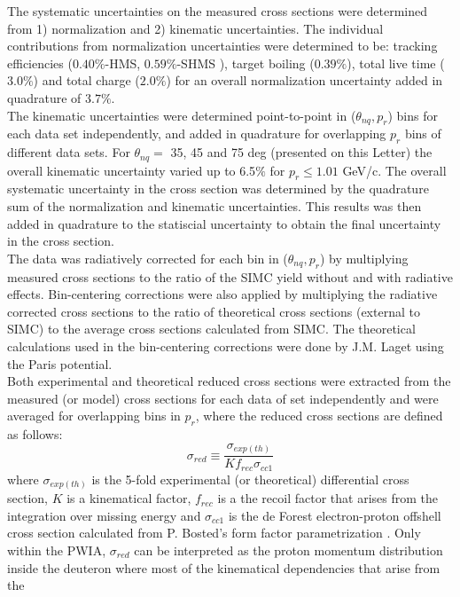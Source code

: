 \indent The systematic uncertainties on the measured cross sections were determined from 1) normalization and 2) kinematic uncertainties. The individual contributions from normalization uncertainties
were determined to be: tracking efficiencies ($0.40 \%$-HMS, $0.59 \%$-SHMS ), target boiling ($0.39 \%$), total live time ($3.0 \%$) and total charge ($2.0\%$)
for an overall normalization uncertainty added in quadrature of $3.7 \%$. \\
\indent The kinematic uncertainties were determined point-to-point in ($\theta_{nq}, p_{r}$) bins for each data set independently, and added in quadrature for overlapping $p_{r}$ bins
of different data sets. For $\theta_{nq}=$ 35, 45 and 75 deg (presented on this Letter) the overall kinematic uncertainty varied up to 6.5$\%$ for $p_{r}\leq1.01$ GeV/c.
The overall systematic uncertainty in the cross section was determined by the quadrature sum of the normalization and kinematic uncertainties. This results was then added in quadrature
to the statiscial uncertainty to obtain the final uncertainty in the cross section. \\
\indent The data was radiatively corrected for each bin in ($\theta_{nq}, p_{r}$) by multiplying measured cross sections to the ratio of the SIMC yield without and with radiative effects. Bin-centering
corrections were also applied by multiplying the radiative corrected cross sections to the ratio of theoretical cross sections (external to SIMC) to the average cross sections calculated from SIMC.
The theoretical calculations used in the bin-centering corrections were done by J.M. Laget using the Paris potential. \\
\indent Both experimental and theoretical reduced cross sections were extracted from the measured (or model) cross sections for each data of set independently and were averaged for overlapping bins in $p_{r}$,
where the reduced cross sections are defined as follows:
\begin{equation}
\sigma_{red} \equiv \frac{\sigma_{exp(th)}}{Kf_{rec}\sigma_{cc1}}
\label{eq:1}
\end{equation}
where $\sigma_{exp(th)}$ is the 5-fold experimental (or theoretical) differential cross section, $K$ is a kinematical factor, $f_{rec}$ is a the recoil factor that arises from the
integration over missing energy and $\sigma_{cc1}$ is the de Forest\cite{DEFOREST1983} electron-proton offshell cross section calculated from P. Bosted's form factor parametrization \cite{PhysRevC.51.409}.
Only within the PWIA, $\sigma_{red}$ can be interpreted as the proton momentum distribution inside the deuteron where most of the kinematical dependencies that arise from the

